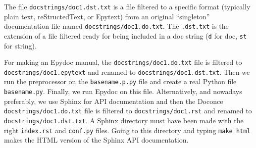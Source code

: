 \documentclass[a4paper,english]{article}
\begin{document}




The file \texttt{docstrings/doc1.dst.txt} is a file filtered to a specific format
(typically plain text, reStructedText, or Epytext) from an original
``singleton'' documentation file named \texttt{docstrings/doc1.do.txt}. The \texttt{.dst.txt}
is the extension of a file filtered ready for being included in a doc
string (\texttt{d} for doc, \texttt{st} for string).

For making an Epydoc manual, the \texttt{docstrings/doc1.do.txt} file is
filtered to \texttt{docstrings/doc1.epytext} and renamed to
\texttt{docstrings/doc1.dst.txt}.  Then we run the preprocessor on the
\texttt{basename.p.py} file and create a real Python file
\texttt{basename.py}. Finally, we run Epydoc on this file. Alternatively, and
nowadays preferably, we use Sphinx for API documentation and then the
Doconce \texttt{docstrings/doc1.do.txt} file is filtered to
\texttt{docstrings/doc1.rst} and renamed to \texttt{docstrings/doc1.dst.txt}. A
Sphinx directory must have been made with the right \texttt{index.rst} and
\texttt{conf.py} files. Going to this directory and typing \texttt{make html} makes
the HTML version of the Sphinx API documentation.
\end{document}
